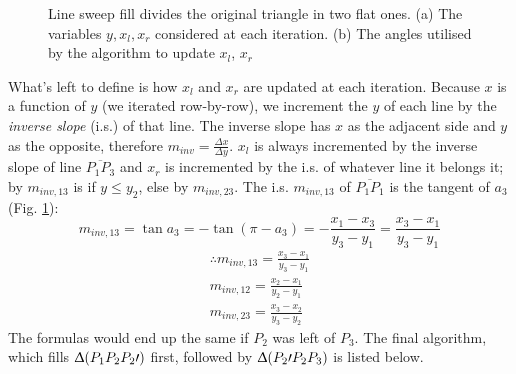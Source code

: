 \documentclass[a4paper]{article}
\begin{document}
\begin{figure}[H]
    \centering
    \qquad
    \caption{Line sweep fill divides the original triangle in two flat ones. (a) The variables $y,x_l,x_r$ considered at each iteration. (b) The angles utilised by the algorithm to update $x_l$, $x_r$}%
    \label{fig:triangle_line_sweep_vars}%
\end{figure}

What's left to define is how $x_l$ and $x_r$ are updated at each iteration. Because $x$ is a function of $y$ (we iterated row-by-row), we increment the $y$ of each line by the \textit{inverse slope} (i.s.) of that line. The inverse slope has $x$ as the adjacent side and $y$ as the opposite, therefore $m_{inv} = \tfrac{\Delta x}{\Delta y}$. $x_l$ is always incremented by the inverse slope of line $\overline{P_1P_3}$ and $x_r$ is incremented by the i.s. of whatever line it belongs it; by $m_{inv,13}$ is if $y \leq y_2$, else by $m_{inv,23}$. The i.s. $m_{inv,13}$ of $\overline{P_1P_1}$ is the tangent of $a_3$ (Fig. \ref{fig:triangle_line_sweep_vars}):
\[
m_{inv,13} = \tan{a_3} = -\tan(\pi - a_3) = -\frac{x_1-x_3}{y_3-y_1} = \frac{x_3-x_1}{y_3-y_1}
\]
\begin{align*}
\therefore
    m_{inv,13} = \frac{x_3-x_1}{y_3-y_1}\\
    m_{inv,12} = \frac{x_2-x_1}{y_2-y_1}\\
    m_{inv,23} = \frac{x_3-x_2}{y_3-y_2}
\end{align*} 
The formulas would end up the same if $P_2$ was left of $P_3$. The final algorithm, which fills $\Updelta (P_1P_2P_2\prime)$ first, followed by $\Updelta ( P_2\prime P_2P_3)$ is listed below.
\end{document}
